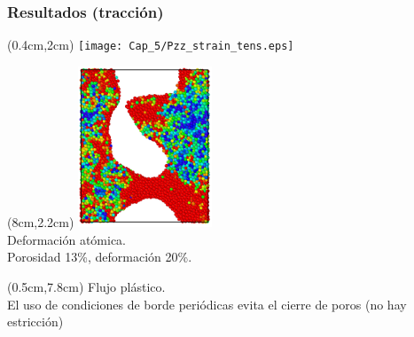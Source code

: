 \begin{frame}
    \frametitle{Resultados (tracci\'on)}
    \begin{textblock*}{7cm}(0.4cm,2cm) %
        \texttt{[image: Cap\_5/Pzz\_strain\_tens.eps]}
    \end{textblock*}
    \begin{textblock*}{4cm}(8cm,2.2cm) %
        \includegraphics[width=4cm]{Presentacion_PANACM_Franco/13_20strain_tens_2.png}\\
        \centering
        \scriptsize{Deformaci\'on at\'omica.\\Porosidad 13\%, deformaci\'on 20\%.}
    \end{textblock*}
    \begin{textblock*}{11.5cm}(0.5cm,7.8cm) %
	\centering
        Flujo pl\'astico.\\
        El uso de condiciones de borde peri\'odicas evita el cierre de poros (no hay estricci\'on)
    \end{textblock*}
\end{frame}

